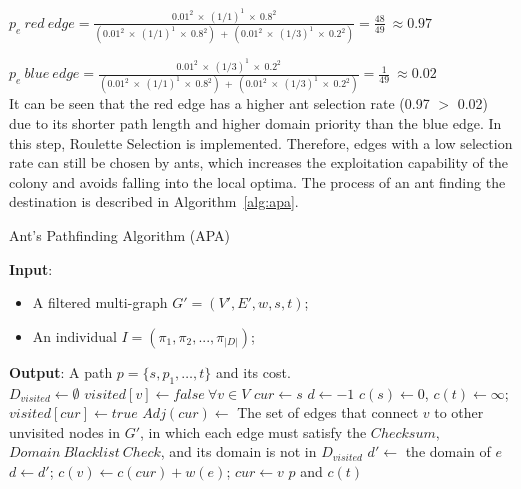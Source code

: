 \bigskip
$
p_e~red~edge = \frac{0.01^2~\times~(1/1)^1~\times~0.8^2}{(0.01^2~\times~(1/1)^1~\times~0.8^2)~+~(0.01^2~\times~(1/3)^1~\times~0.2^2)} = \frac{48}{49}~\approx0.97
$
\bigskip

$
p_e~blue~edge = \frac{0.01^2~\times~(1/3)^1~\times~0.2^2}{(0.01^2~\times~(1/1)^1~\times~0.8^2)~+~(0.01^2~\times~(1/3)^1~\times~0.2^2)} = \frac{1}{49}~\approx0.02
$ \\ 

It can be seen that the red edge has a higher ant selection rate (0.97 $>$ 0.02) due to its shorter path length and higher domain priority than the blue edge. In this step, Roulette Selection is implemented. Therefore, edges with a low selection rate can still be chosen by ants, which increases the exploitation capability of the colony and avoids falling into the local optima. The process of an ant finding the destination is described in Algorithm~\ref{alg:apa}.

\begin{algorithm}
	\caption{Ant's Pathfinding Algorithm (APA)}
	\label{alg:apa}
	\textbf{Input}:	
	\begin{itemize}
		\item A filtered multi-graph $G' = (V', E', w, s, t)$;
		\item An individual $I = (\pi_1, \pi_2,...,\pi_{|D|})$;
	\end{itemize}
	\textbf{Output}: A path $p = \{s, p_1, \dots, t\}$ and its cost. \\
	\Begin
	{	
		$D_{visited} \leftarrow\emptyset$ \;
		$visited[v] \leftarrow false~\forall v \in V$ \;
		$cur \leftarrow s$ \;
		$d \leftarrow  -1$ \;
		$c(s) \leftarrow 0$, $c(t) \leftarrow \infty$;\\
		{
			$visited[cur] \leftarrow true$\;
			$Adj(cur) \leftarrow$ The set of edges that connect $v$ to other unvisited nodes in $G'$, in which each edge must satisfy the $Checksum$, $Domain~Blacklist~Check$, and its domain is not in $D_{visited}$\;
			$d' \leftarrow$ the domain of $e$\;
			$d \leftarrow d'$; $c(v) \leftarrow c(cur) + w(e)$;  $cur \leftarrow v$\; 
		}
		\Return $p$ and $c(t)$\;
	}
\end{algorithm}

